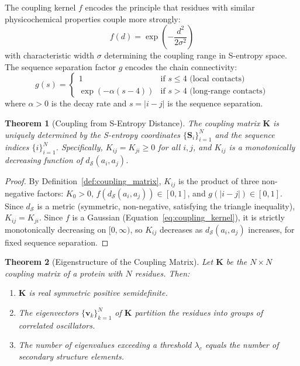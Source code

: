 \documentclass[11pt,twocolumn,a4paper]{article}
\newtheorem{theorem}{Theorem}[section]
\theoremstyle{definition}
\theoremstyle{remark}
\newcommand{\Sspace}{\mathcal{S}}
\newcommand{\Scoord}{\mathbf{S}}
\newcommand{\coupmat}{\mathbf{K}}
\begin{document}
The coupling kernel $f$ encodes the principle that residues with similar physicochemical properties couple more strongly:
\begin{equation}
\label{eq:coupling_kernel}
f(d) = \exp\!\left(-\frac{d^2}{2\sigma^2}\right)
\end{equation}
with characteristic width $\sigma$ determining the coupling range in S-entropy space. The sequence separation factor $g$ encodes the chain connectivity:
\begin{equation}
\label{eq:seq_factor}
g(s) = \begin{cases}
1 & \text{if } s \leq 4 \text{ (local contacts)} \\
\exp(-\alpha(s - 4)) & \text{if } s > 4 \text{ (long-range contacts)}
\end{cases}
\end{equation}
where $\alpha > 0$ is the decay rate and $s = |i - j|$ is the sequence separation.

\begin{theorem}[Coupling from S-Entropy Distance]
\label{thm:coupling_s_entropy}
The coupling matrix $\coupmat$ is uniquely determined by the S-entropy coordinates $\{\Scoord_i\}_{i=1}^N$ and the sequence indices $\{i\}_{i=1}^N$. Specifically, $K_{ij} = K_{ji} \geq 0$ for all $i, j$, and $K_{ij}$ is a monotonically decreasing function of $d_{\Sspace}(a_i, a_j)$.
\end{theorem}

\begin{proof}
By Definition~\ref{def:coupling_matrix}, $K_{ij}$ is the product of three non-negative factors: $K_0 > 0$, $f(d_{\Sspace}(a_i, a_j)) \in [0,1]$, and $g(|i-j|) \in [0,1]$. Since $d_{\Sspace}$ is a metric (symmetric, non-negative, satisfying the triangle inequality), $K_{ij} = K_{ji}$. Since $f$ is a Gaussian (Equation~\ref{eq:coupling_kernel}), it is strictly monotonically decreasing on $[0,\infty)$, so $K_{ij}$ decreases as $d_{\Sspace}(a_i, a_j)$ increases, for fixed sequence separation.
\end{proof}

\begin{theorem}[Eigenstructure of the Coupling Matrix]
\label{thm:eigenstructure}
Let $\coupmat$ be the $N \times N$ coupling matrix of a protein with $N$ residues. Then:
\begin{enumerate}
    \item $\coupmat$ is real symmetric positive semidefinite.
    \item The eigenvectors $\{\mathbf{v}_k\}_{k=1}^N$ of $\coupmat$ partition the residues into groups of correlated oscillators.
    \item The number of eigenvalues exceeding a threshold $\lambda_c$ equals the number of secondary structure elements.
\end{enumerate}
\end{theorem}
\end{document}
